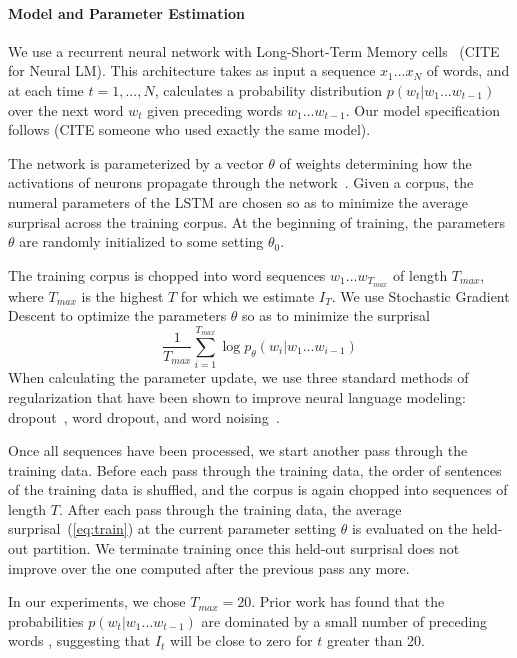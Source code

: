 \paragraph{Model and Parameter Estimation}
We use a recurrent neural network with Long-Short-Term Memory cells~\citep{hochreiter-long-1997} (CITE for Neural LM).
This architecture takes as input a sequence $x_1 ... x_N$ of words, and at each time $t=1, ..., N$, calculates a probability distribution $p(w_t|w_1...w_{t-1})$ over the next word $w_{t}$ given preceding words $w_1 ... w_{t-1}$.
Our model specification follows (CITE someone who used exactly the same model).

The network is parameterized by a vector $\theta$ of weights determining how the activations of neurons propagate through the network~\citep{hochreiter-long-1997}.
Given a corpus, the numeral parameters of the LSTM are chosen so as to minimize the average surprisal across the training corpus.
At the beginning of training, the parameters $\theta$ are randomly initialized to some setting $\theta_0$.

The training corpus is chopped into word sequences $w_1 ... w_{T_{max}}$ of length ${T_{max}}$, where ${T_{max}}$ is the highest $T$ for which we estimate $I_T$. %
We use Stochastic Gradient Descent to optimize the parameters $\theta$ so as to minimize the surprisal
\begin{equation}\label{eq:train}
	\frac{1}{T_{max}} \sum_{i=1}^{T_{max}} \log p_\theta(w_i|w_1...w_{i-1})
\end{equation}
When calculating the parameter update, we use three standard methods of regularization that have been shown to improve neural language modeling: dropout~\citep{srivastava-dropout:-2014}, word dropout, and word noising~\citep{xie2017data}.

Once all sequences have been processed, we start another pass through the training data.
Before each pass through the training data, the order of sentences of the training data is shuffled, and the corpus is again chopped into sequences of length $T$.
After each pass through the training data, the average surprisal~(\ref{eq:train}) at the current parameter setting $\theta$ is evaluated on the held-out partition.
We terminate training once this held-out  surprisal does not improve over the one computed after the previous pass any more.

In our experiments, we chose $T_{max} = 20$. Prior work has found that the probabilities $p(w_t|w_1...w_{t-1})$ are dominated by a small number of preceding words \citep{daniluk2017frustratingly}, suggesting that $I_t$ will be close to zero for $t$ greater than 20.



